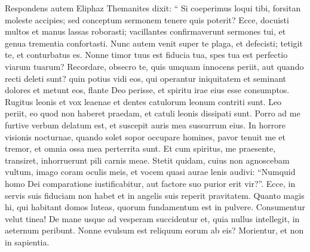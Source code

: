 \begin{biblechapter}
\begin{biblechapter}
\begin{biblechapter}
\begin{biblechapter}
\verse Respondens autem Eliphaz Themanites dixit:
 \verse “ Si coeperimus loqui tibi, forsitan moleste accipies;
 sed conceptum sermonem tenere quis poterit?
 \verse Ecce, docuisti multos
 et manus lassas roborasti;
 \verse vacillantes confirmaverunt sermones tui,
 et genua trementia confortasti.
 \verse Nunc autem venit super te plaga, et defecisti;
 tetigit te, et conturbatus es.
 \verse Nonne timor tuus est fiducia tua,
 spes tua est perfectio viarum tuarum?
 \verse Recordare, obsecro te, quis umquam innocens periit,
 aut quando recti deleti sunt?
 \verse quin potius vidi eos, qui operantur iniquitatem
 et seminant dolores et metunt eos, 
\verse flante Deo perisse,
 et spiritu irae eius esse consumptos. 
\verse Rugitus leonis et vox leaenae
 et dentes catulorum leonum contriti sunt.
 \verse Leo periit, eo quod non haberet praedam,
 et catuli leonis dissipati sunt.
 \verse Porro ad me furtive verbum delatum est,
 et suscepit auris mea sussurrum eius.
 \verse In horrore visionis nocturnae,
 quando solet sopor occupare homines,
 \verse pavor tenuit me et tremor,
 et omnia ossa mea perterrita sunt. 
\verse Et cum spiritus, me praesente, transiret,
 inhorruerunt pili carnis meae.
 \verse Stetit quidam, cuius non agnoscebam vultum,
 imago coram oculis meis,
 et vocem quasi aurae lenis audivi:
 \verse “Numquid homo Dei comparatione iustificabitur,
 aut factore suo purior erit vir?”.
 \verse Ecce, in servis suis fiduciam non habet
 et in angelis suis reperit pravitatem. 
\verse Quanto magis hi, qui habitant domos luteas,
 quorum fundamentum est in pulvere.
 Consumentur velut tinea!
 \verse De mane usque ad vesperam succidentur
 et, quia nullus intellegit, in aeternum peribunt.
 \verse Nonne evulsum est reliquum eorum ab eis?
 Morientur, et non in sapientia.
 

\end{biblechapter}
\end{biblechapter}
\end{biblechapter}
\end{biblechapter}

